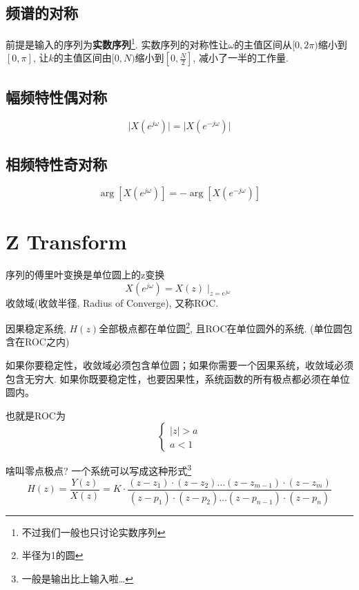 \documentclass[a4paper]{report}
\begin{document}
\subsection{频谱的对称}
前提是输入的序列为\textbf{实数序列}\footnote{不过我们一般也只讨论实数序列}. 实数序列的对称性让$\omega$的主值区间从$[0,2\pi)$缩小到$[0,\pi]$, 让$k$的主值区间由$[0,N)$缩小到$[0,\frac{N}{2}]$, 减小了一半的工作量. 
\subsection{幅频特性偶对称}
\begin{equation}
  \lvert X(e^{j\omega})\rvert =\lvert X(e^{-j\omega})\rvert
\end{equation}
\subsection{相频特性奇对称}
\begin{equation}
  \arg [X(e^{j\omega})] =-\arg [X(e^{-j\omega})]
\end{equation}
\section{Z Transform}
序列的傅里叶变换是单位圆上的z变换
$$X(e^{j\omega})=X(z)\mid_{z=e^{j\omega}}$$
收敛域(收敛半径, Radius of Converge), 又称ROC. 

因果稳定系统, $H(z)$全部极点都在单位圆\footnote{半径为1的圆}, 且ROC在单位圆外的系统. (单位圆包含在ROC之内)

如果你要稳定性，收敛域必须包含单位圆；如果你需要一个因果系统，收敛域必须包含无穷大. 如果你既要稳定性，也要因果性，系统函数的所有极点都必须在单位圆内。

也就是ROC为
\begin{equation}
  \begin{cases}
    \lvert z \rvert > a \\
    a < 1
  \end{cases}
\end{equation}

啥叫零点极点? 一个系统可以写成这种形式\footnote{一般是输出比上输入啦\dots}
\begin{equation}
  H(z)=\frac{Y(z)}{X(z)}=K\cdot\frac{(z-z_1)\cdot(z-z_2)\dots (z-z_{m-1})\cdot (z-z_{m})}{(z-p_1)\cdot(z-p_2)\dots (z-p_{n-1})\cdot (z-p_{n})}
\end{equation}
\end{document}
